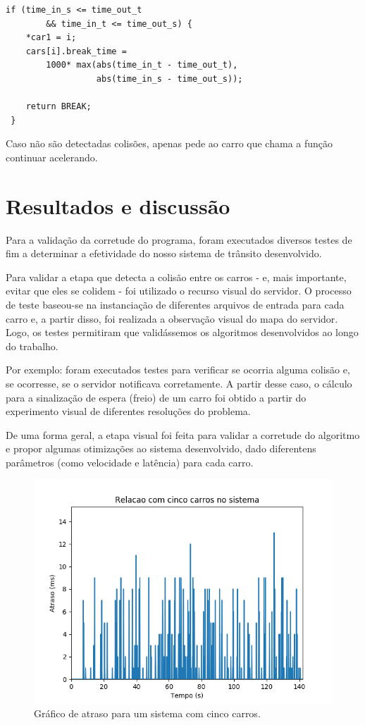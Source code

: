\documentclass[10pt,twocolumn,letterpaper]{article}
\begin{document}
\begin{lstlisting}[caption={Continuação do algoritmo de detecção de colisão (3)}, label=Algorithm]
if (time_in_s <= time_out_t 
        && time_in_t <= time_out_s) {
    *car1 = i;
    cars[i].break_time = 
        1000* max(abs(time_in_t - time_out_t), 
                  abs(time_in_s - time_out_s));
    
    return BREAK;
 }
\end{lstlisting}

Caso não são detectadas colisões, apenas pede ao carro que chama a função continuar acelerando.

\section{Resultados e discussão}
Para a validação da corretude do programa, foram executados diversos testes de fim a determinar a efetividade do nosso sistema de trânsito desenvolvido.

Para validar a etapa que detecta a colisão entre os carros - e, mais importante, evitar que eles se colidem - foi utilizado o recurso visual do servidor. O processo de teste baseou-se na instanciação de diferentes arquivos de entrada para cada carro e, a partir disso, foi realizada a observação visual do mapa do servidor. Logo, os testes permitiram que validássemos os algoritmos desenvolvidos ao longo do trabalho.

Por exemplo: foram executados testes para verificar se ocorria alguma colisão e, se ocorresse, se o servidor notificava corretamente. A partir desse caso, o cálculo para a sinalização de espera (freio) de um carro foi obtido a partir do experimento visual de diferentes resoluções do problema.

De uma forma geral, a etapa visual foi feita para validar a corretude do algoritmo e propor algumas otimizações ao sistema desenvolvido, dado diferentens parâmetros (como velocidade e latência) para cada carro.

\begin{figure}[ht!]
    \center\includegraphics[width=.75\hsize]{img/cinco}
    \caption{Gráfico de atraso para um sistema com cinco carros.}
\end{figure}
\end{document}
